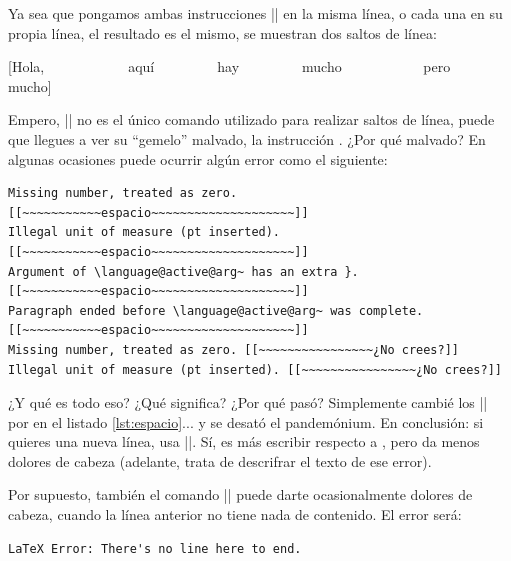 Ya sea que pongamos ambas instrucciones |\newline| en la misma línea, o cada una en su propia línea, el resultado es el mismo, se muestran dos saltos de línea:

\begin{displayquote}{}
[Hola,~~~~~~~~~~~~aquí~~~~~~~~~hay~~~~~~~~~mucho~~~~~~~~~~~
pero mucho]~~~~~~~~~~~~~~~~~
\newline\newline
[~~~~~~~~~~~espacio~~~~~~~~~~~~~~~~~~~~]
\newline
\newline
[~~~~~~~~~~~~~~~~¿No crees?]
\end{displayquote}

Empero, |\newline| no es el único comando utilizado para realizar saltos de línea, puede que llegues a ver su ``gemelo'' malvado, la instrucción \codigo{\textbackslash}. ¿Por qué malvado? En algunas ocasiones puede ocurrir algún error como el siguiente:

\begin{lstlisting}[style=errores]
Missing number, treated as zero. [[~~~~~~~~~~~espacio~~~~~~~~~~~~~~~~~~~~]]
Illegal unit of measure (pt inserted). [[~~~~~~~~~~~espacio~~~~~~~~~~~~~~~~~~~~]]
Argument of \language@active@arg~ has an extra }. [[~~~~~~~~~~~espacio~~~~~~~~~~~~~~~~~~~~]]
Paragraph ended before \language@active@arg~ was complete. [[~~~~~~~~~~~espacio~~~~~~~~~~~~~~~~~~~~]]
Missing number, treated as zero. [[~~~~~~~~~~~~~~~~¿No crees?]]
Illegal unit of measure (pt inserted). [[~~~~~~~~~~~~~~~~¿No crees?]]
\end{lstlisting}

¿Y qué es todo eso? ¿Qué significa? ¿Por qué pasó? Simplemente cambié los |\newline| por \codigo{\textbackslash} en el listado \ref{lst:espacio}... y se desató el pandemónium. En conclusión: si quieres una nueva línea, usa |\newline|. Sí, es más escribir respecto a \codigo{\textbackslash}, pero da menos dolores de cabeza (adelante, trata de descrifrar el texto de ese error).

Por supuesto, también el comando |\newline| puede darte ocasionalmente dolores de cabeza, cuando la línea anterior no tiene nada de contenido. El error será:

\begin{lstlisting}[style=errores]
LaTeX Error: There's no line here to end.
\end{lstlisting}

